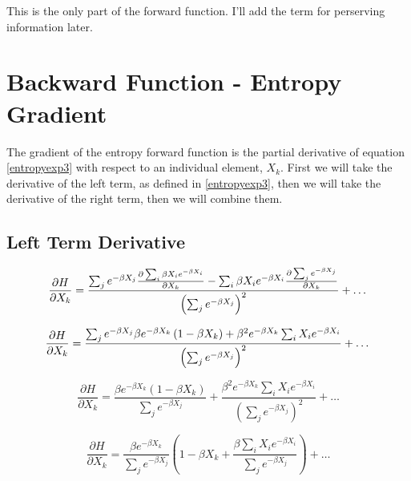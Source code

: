 \noindent This is the only part of the forward function. I'll add the term for perserving information later.

\section{Backward Function - Entropy Gradient} \label{backward}
\noindent The gradient of the entropy forward function is the partial derivative of equation \ref{entropyexp3} with respect to an individual element, $X_{k}$. First we will take the derivative of the left term, as defined in \ref{entropyexp3}, then we will take the derivative of the right term, then we will combine them.

\subsection{Left Term Derivative}


\begin{displaymath}
    \frac{\partial H}{\partial X_{k}} =
    \frac{\sum_{j}e^{-\beta X_{j}}\frac{\partial\sum_{i}\beta X_{i} e^{-\beta X_{i}}}{\partial X_{k}}
    - \sum_{i}\beta X_{i} e^{-\beta X_{i}}\frac{\partial\sum_{j}e^{-\beta X_{j}}}{\partial X_{k}}}{\left(\sum_{j}e^{-\beta X_{j}}\right)^{2}}
    + \ldots\\
\end{displaymath}

\begin{displaymath}
    \frac{\partial H}{\partial X_{k}} =
    \frac{\sum_{j}e^{-\beta X_{j}} \beta e^{-\beta X_{k}}\left(1 - \beta X_{k}\right) + \beta^{2} e^{-\beta X_{k}} \sum_{i}X_{i}e^{-\beta X_{i}}}{\left(\sum_{j}e^{-\beta X_{j}}\right)^{2}}
    + \ldots\\
\end{displaymath}

\begin{displaymath}
    \frac{\partial H}{\partial X_{k}} =
    \frac{\beta e^{-\beta X_{k}}\left(1 - \beta X_{k}\right)}{\sum_{j}e^{-\beta X_{j}}}
    + \frac{\beta^{2} e^{-\beta X_{k}} \sum_{i}X_{i}e^{-\beta X_{i}}}{\left(\sum_{j}e^{-\beta X_{j}}\right)^{2}}
    + \ldots
\end{displaymath}

\begin{displaymath}
    \frac{\partial H}{\partial X_{k}} =
    \frac{\beta e^{-\beta X_{k}}}{\sum_{j}e^{-\beta X_{j}}} \left(1 - \beta X_{k} + \frac{\beta \sum_{i}X_{i}e^{-\beta X_{i}}}{\sum_{j}e^{-\beta X_{j}}}\right)
    + \ldots
\end{displaymath}

